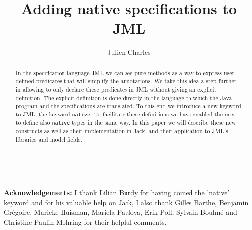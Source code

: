 \documentclass{llncs}
\begin{document}
%
%
\pagestyle{headings}  %

%
%
\title{Adding native specifications to JML}

\author{Julien Charles }


\maketitle

\begin{abstract}
In the specification language JML we can see pure methods as a way to 
express user-defined predicates that will simplify the annotations. 
We take this idea a step further in allowing 
to only declare these predicates in JML without giving an explicit definition.
The explicit definition is done directly in the language
to which the Java program and the specifications are 
translated. To this end we introduce a new keyword to JML, the keyword {\tt native}. 
To facilitate these definitions we have enabled the user to define 
also {\tt native} types in the same way.
In this paper we will describe these new constructs as well as their implementation in Jack, 
 and their application to JML's libraries and model fields.
\end{abstract}
%







\ \\
\begin{small}
\begin{it}
{\bf Acknowledgements:} I thank Lilian Burdy for having coined the 'native' keyword and 
for his valuable help on Jack, 
I also thank Gilles Barthe, Benjamin Gr\'egoire, Marieke Huisman, Mariela Pavlova, Erik Poll,
Sylvain Boulm\'e and Christine Paulin-Mohring for their helpful comments.
\end{it}
\end{small} 


%
%


\end{document}
